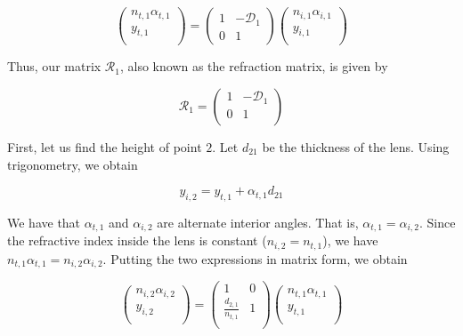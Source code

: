 \documentclass[11pt]{article}
\begin{document}
\begin{pproblem}
\begin{pssolution*}{}{}
\begin{alternativas}
            \[\left(\begin{matrix}
                n_{t,1}\alpha_{t,1} \\
                y_{t,1}\\
            \end{matrix}\right) = \left(\begin{matrix}
                1 & - \mathcal{D}_1 \\
                0 & 1
            \end{matrix}\right)\left(\begin{matrix}
                n_{i,1}\alpha_{i,1} \\
                y_{i,1}\\
            \end{matrix}\right)\]

            Thus, our matrix \(\mathcal{R}_1\), also known as the refraction matrix, is given by

            \[\boxed{\mathcal{R}_1 = \left(\begin{matrix}
            1 & -\mathcal{D}_1 \\
            0 & 1 \\
            \end{matrix}\right)}\]

        \item First, let us find the height of point \(2\). Let \(d_{21}\) be the thickness of the lens. Using trigonometry, we obtain
        
        \[y_{i,2} = y_{t,1} + \alpha_{t,1}d_{21}\]

        We have that \(\alpha_{t,1}\) and \(\alpha_{i,2}\) are alternate interior angles. That is, \(\alpha_{t,1}=\alpha_{i,2}\). Since the refractive index inside the lens is constant (\(n_{i,2} = n_{t,1}\)), we have \(n_{t,1}\alpha_{t,1} = n_{i,2}\alpha_{i,2}\). Putting the two expressions in matrix form, we obtain

        \[\begin{pmatrix}
            n_{i,2}\alpha_{i,2}\\
            y_{i,2}\\
        \end{pmatrix}
        =
        \begin{pmatrix}
            1 & 0 \\
            \frac{d_{2,1}}{n_{t,1}} & 1 \\
        \end{pmatrix}
        \begin{pmatrix}
            n_{t,1}\alpha_{t,1} \\
            y_{t,1}\\
        \end{pmatrix}
        \]


\end{alternativas}
\end{pssolution*}
\end{pproblem}
\end{document}
